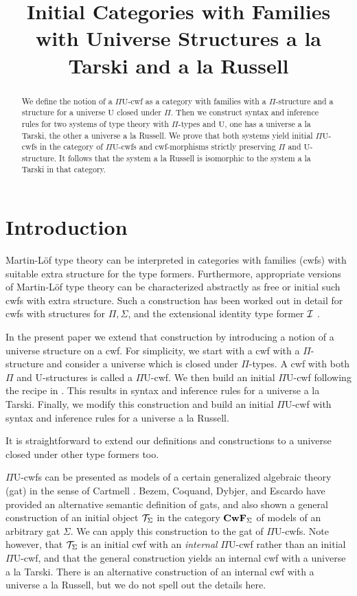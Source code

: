 \documentclass{lmcs}
\title{Initial Categories with Families\\with Universe Structures 
a la Tarski and a la Russell}
\def\UU{\mathrm{U}}
\begin{document}
\maketitle

\begin{abstract}
We define the notion of a $\Pi\UU$-cwf as a category with families with a $\Pi$-structure and a structure for a universe $\UU$ closed under $\Pi$. Then we construct syntax and inference rules for two systems of type theory with $\Pi$-types and $\UU$, one has a universe a la Tarski, the other a universe a la Russell. We prove that both systems yield initial $\Pi\UU$-cwfs in the category of $\Pi\UU$-cwfs and cwf-morphisms strictly preserving $\Pi$ and $\UU$-structure. It follows that the system a la Russell is isomorphic to the system a la Tarski in that category.
 \end{abstract}

\allowdisplaybreaks
\section{Introduction}

Martin-Löf type theory can be interpreted in categories with families (cwfs) with suitable extra structure for the type formers. Furthermore, appropriate versions of Martin-Löf type theory can be characterized  abstractly as free or initial such cwfs with extra structure. Such a construction has been worked out in detail for cwfs with structures for $\Pi, \Sigma$, and the extensional identity type former ${\mathcal I}$ \cite{castellan:tlca2015}. 

In the present paper we extend that construction by introducing a notion of a universe structure on a cwf. For simplicity, we start with a cwf with a $\Pi$-structure and consider a universe which is closed under $\Pi$-types. A cwf with both $\Pi$ and $\UU$-structures is called a $\Pi\UU$-cwf. We then build an initial  $\Pi\UU$-cwf  following the recipe in \cite{castellan:tlca2015}. This results in syntax and inference rules for a universe a la Tarski. Finally, we modify this construction and build an initial  $\Pi\UU$-cwf  with syntax and inference rules for a universe a la Russell.

It is straightforward to extend our definitions and constructions to a universe closed under other type formers too.

$\Pi\UU$-cwfs can be presented as models of a certain generalized algebraic theory (gat) in the sense of Cartmell \cite{cartmell:phd}. Bezem, Coquand, Dybjer, and Escardo \cite{bezem:hofmann} have provided an alternative semantic definition of gats, and also shown a general construction of an initial object ${\mathcal T}_\Sigma$ in the category $\textbf{CwF}_\Sigma$ of models of an arbitrary gat $\Sigma$. We can apply this construction to the gat of $\Pi\UU$-cwfs. Note however, that ${\mathcal T}_\Sigma$ is an initial cwf with an {\em internal} $\Pi\UU$-cwf rather than an initial $\Pi\UU$-cwf, and that the general construction yields an internal cwf with a universe a la Tarski. There is an alternative construction of an internal cwf with a universe a la Russell, but we do not spell out the details here.
\end{document}

